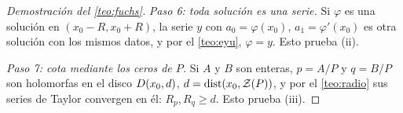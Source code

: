 \begin{proof}[Demostración del \cref{teo:fuchs}]
\emph{Paso 6: toda solución es una serie.} Si $\varphi$ es una solución en
$(x_0-R,x_0+R)$, la serie $y$ con $a_0=\varphi(x_0)$, $a_1=\varphi'(x_0)$ es
otra solución con los mismos datos, y por el \cref{teo:eyu}, $\varphi=y$.
Esto prueba (ii).

\emph{Paso 7: cota mediante los ceros de $P$.} Si $A$ y $B$ son enteras,
$p=A/P$ y $q=B/P$ son holomorfas en el disco
$D(x_0,d)$, $d=\operatorname{dist}(x_0,\mathcal Z(P))$, y por el \cref{teo:radio}
sus series de Taylor convergen en él: $R_p,R_q\ge d$. Esto prueba (iii).
\end{proof}
